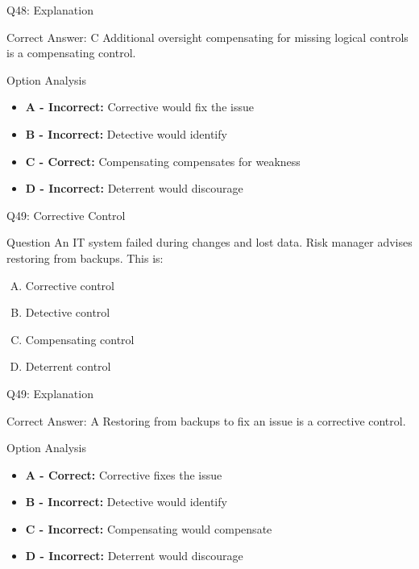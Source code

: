 \documentclass{beamer}
\begin{document}
	\begin{frame}{Q48: Explanation}
		\begin{block}{Correct Answer: C}
			Additional oversight compensating for missing logical controls is a compensating control.
		\end{block}
		\begin{block}{Option Analysis}
			\begin{itemize}
				\item \textbf{A - Incorrect:} Corrective would fix the issue
				\item \textbf{B - Incorrect:} Detective would identify
				\item \textbf{C - Correct:} Compensating compensates for weakness
				\item \textbf{D - Incorrect:} Deterrent would discourage
			\end{itemize}
		\end{block}
	\end{frame}
	
	\begin{frame}{Q49: Corrective Control}
		\begin{block}{Question}
			An IT system failed during changes and lost data. Risk manager advises restoring from backups. This is:
		\end{block}
		\begin{enumerate}[(A)]
			\item Corrective control
			\item Detective control
			\item Compensating control
			\item Deterrent control
		\end{enumerate}
	\end{frame}
	
	\begin{frame}{Q49: Explanation}
		\begin{block}{Correct Answer: A}
			Restoring from backups to fix an issue is a corrective control.
		\end{block}
		\begin{block}{Option Analysis}
			\begin{itemize}
				\item \textbf{A - Correct:} Corrective fixes the issue
				\item \textbf{B - Incorrect:} Detective would identify
				\item \textbf{C - Incorrect:} Compensating would compensate
				\item \textbf{D - Incorrect:} Deterrent would discourage
			\end{itemize}
		\end{block}
	\end{frame}
	
\end{document}
